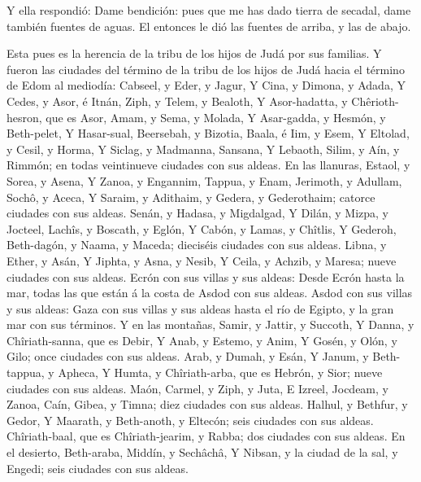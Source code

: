 Y ella respondió: Dame bendición: pues que me has dado
tierra de secadal, dame también fuentes de aguas. El entonces le dió las
fuentes de arriba, y las de abajo.

 Esta pues es la herencia de la tribu de los hijos de Judá
por sus familias.  Y fueron las ciudades del término de la
tribu de los hijos de Judá hacia el término de Edom al mediodía:
Cabseel, y Eder, y Jagur,  Y Cina, y Dimona, y Adada,
 Y Cedes, y Asor, é Itnán,  Ziph, y Telem, y
Bealoth,  Y Asor-hadatta, y Chêrioth-hesron, que es Asor,
 Amam, y Sema, y Molada,  Y Asar-gadda, y
Hesmón, y Beth-pelet,  Y Hasar-sual, Beersebah, y Bizotia,
 Baala, é Iim, y Esem,  Y Eltolad, y Cesil, y
Horma,  Y Siclag, y Madmanna, Sansana,  Y
Lebaoth, Silim, y Aín, y Rimmón; en todas veintinueve ciudades con sus
aldeas.  En las llanuras, Estaol, y Sorea, y Asena,
 Y Zanoa, y Engannim, Tappua, y Enam, 
Jerimoth, y Adullam, Sochô, y Aceca,  Y Saraim, y Adithaim,
y Gedera, y Gederothaim; catorce ciudades con sus aldeas. 
Senán, y Hadasa, y Migdalgad,  Y Dilán, y Mizpa, y Jocteel,
 Lachîs, y Boscath, y Eglón,  Y Cabón, y
Lamas, y Chîtlis,  Y Gederoh, Beth-dagón, y Naama, y
Maceda; dieciséis ciudades con sus aldeas.  Libna, y Ether,
y Asán,  Y Jiphta, y Asna, y Nesib,  Y Ceila,
y Achzib, y Maresa; nueve ciudades con sus aldeas.  Ecrón
con sus villas y sus aldeas:  Desde Ecrón hasta la mar,
todas las que están á la costa de Asdod con sus aldeas. 
Asdod con sus villas y sus aldeas: Gaza con sus villas y sus aldeas
hasta el río de Egipto, y la gran mar con sus términos.  Y
en las montañas, Samir, y Jattir, y Succoth,  Y Danna, y
Chîriath-sanna, que es Debir,  Y Anab, y Estemo, y Anim,
 Y Gosén, y Olón, y Gilo; once ciudades con sus aldeas.
 Arab, y Dumah, y Esán,  Y Janum, y
Beth-tappua, y Apheca,  Y Humta, y Chîriath-arba, que es
Hebrón, y Sior; nueve ciudades con sus aldeas.  Maón,
Carmel, y Ziph, y Juta,  E Izreel, Jocdeam, y Zanoa,
 Caín, Gibea, y Timna; diez ciudades con sus aldeas.
 Halhul, y Bethfur, y Gedor,  Y Maarath, y
Beth-anoth, y Eltecón; seis ciudades con sus aldeas. 
Chîriath-baal, que es Chîriath-jearim, y Rabba; dos ciudades con sus
aldeas.  En el desierto, Beth-araba, Middín, y Sechâchâ,
 Y Nibsan, y la ciudad de la sal, y Engedi; seis ciudades
con sus aldeas.

